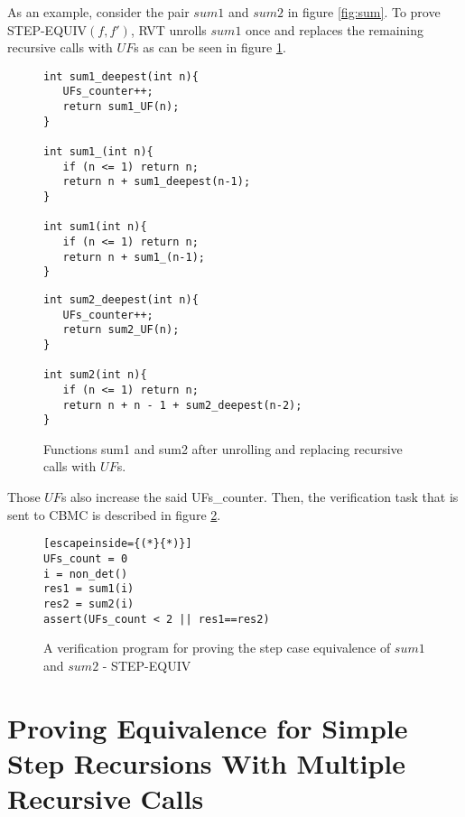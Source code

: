 As an example, consider the pair $sum1$ and $sum2$ in figure \ref{fig:sum}. To prove STEP-EQUIV$(f,f')$, RVT unrolls $sum1$ once and replaces the remaining recursive calls with $UF$s as can be seen in figure \ref{fig:sumUnrolled}.
\begin{figure}[h]
\begin{center}
\begin{minipage}{7 cm}
\begin{lstlisting}
int sum1_deepest(int n){
   UFs_counter++;
   return sum1_UF(n);
}

int sum1_(int n){
   if (n <= 1) return n;
   return n + sum1_deepest(n-1);
}

int sum1(int n){
   if (n <= 1) return n;
   return n + sum1_(n-1);
}
\end{lstlisting}
\end{minipage}
\begin{minipage}{7 cm}
\begin{lstlisting}
int sum2_deepest(int n){
   UFs_counter++;
   return sum2_UF(n);
}

int sum2(int n){
   if (n <= 1) return n;
   return n + n - 1 + sum2_deepest(n-2);
}
\end{lstlisting}
\end{minipage}
\caption{Functions sum1 and sum2 after unrolling and replacing recursive calls with $UF$s.}
\label{fig:sumUnrolled}
\end{center}
\end{figure} 
Those $UF$s also increase the said UFs\_counter. Then, the verification task that is sent to CBMC is described in figure \ref{fig:rvtstepcase}.

\begin{figure} [h]
\begin{center}
\begin{minipage}{7 cm}
\begin{lstlisting}[escapeinside={(*}{*)}]
UFs_count = 0
i = non_det()
res1 = sum1(i)
res2 = sum2(i)
assert(UFs_count < 2 || res1==res2)
\end{lstlisting}
\end{minipage}
\caption{A verification program for proving the step case equivalence of $sum1$ and $sum2$ - STEP-EQUIV}
\label{fig:rvtstepcase}
\end{center}
\end{figure}


\section{Proving Equivalence for Simple Step Recursions With Multiple Recursive Calls}
\label{sec:newproof}
